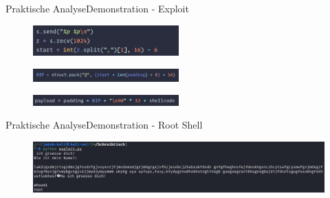 \begin{frame}{Praktische Analyse}{Demonstration - Exploit}
    \begin{figure}[h]
        \centering
        \includegraphics[width=0.5\textwidth,height=0.75\textheight,keepaspectratio]{images/format.png}
    \end{figure}
    \begin{figure}[h]
        \centering
        \includegraphics[width=0.5\textwidth,height=0.75\textheight,keepaspectratio]{images/rip.png}
    \end{figure}
    \begin{figure}[h]
        \centering
        \includegraphics[width=0.5\textwidth,height=0.75\textheight,keepaspectratio]{images/payload.png}
    \end{figure}
\end{frame}

\begin{frame}{Praktische Analyse}{Demonstration - Root Shell}
    \begin{figure}[h]
        \centering
        \includegraphics[width=1\textwidth,height=0.75\textheight,keepaspectratio]{images/root.png}
    \end{figure}
\end{frame}

